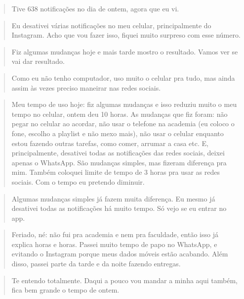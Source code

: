 \begin{quote}
Tive 638 notificações no dia de ontem, agora que eu vi.
\end{quote}

\begin{quote}
Eu desativei várias notificações no meu celular, principalmente do Instagram. Acho que vou fazer isso, fiquei muito surpreso com esse número.
\end{quote}

\begin{quote}
Fiz algumas mudanças hoje e mais tarde mostro o resultado. Vamos ver se vai dar resultado.
\end{quote}

\begin{quote}
Como eu não tenho computador, uso muito o celular pra tudo, mas ainda assim às vezes preciso maneirar nas redes sociais.
\end{quote}

\begin{quote}
Meu tempo de uso hoje: fiz algumas mudanças e isso reduziu muito o meu tempo no celular, ontem deu 10 horas. As mudanças que fiz foram: não pegar no celular ao acordar, não usar o telefone na academia (eu coloco o fone, escolho a playlist e não mexo mais), não usar o celular enquanto estou fazendo outras tarefas, como comer, arrumar a casa etc. E, principalmente, desativei todas as notificações das redes sociais, deixei apenas o WhatsApp. São mudanças simples, mas fizeram diferença pra mim. Também coloquei limite de tempo de 3 horas pra usar as redes sociais. Com o tempo eu pretendo diminuir.
\end{quote}

\begin{quote}
Algumas mudanças simples já fazem muita diferença. Eu mesmo já desativei todas as notificações há muito tempo. Só vejo se eu entrar no app.
\end{quote}

\begin{quote}
Feriado, né: não fui pra academia e nem pra faculdade, então isso já explica horas e horas. Passei muito tempo de papo no WhatsApp, e evitando o Instagram porque meus dados móveis estão acabando. Além disso, passei parte da tarde e da noite fazendo entregas.
\end{quote}

\begin{quote}
Te entendo totalmente. Daqui a pouco vou mandar a minha aqui também, fica bem grande o tempo de ontem.
\end{quote}

